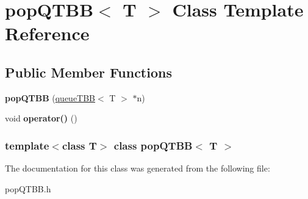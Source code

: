 \hypertarget{classpopQTBB}{
\section{popQTBB$<$ T $>$ Class Template Reference}
\label{classpopQTBB}
}
\subsection*{Public Member Functions}
\begin{DoxyCompactItemize}
\item 
\hypertarget{classpopQTBB_a4351f1dbfc315e5c99afd021fcaa80a1}{
{\bfseries popQTBB} (\hyperlink{classqueueTBB}{queueTBB}$<$ T $>$ $\ast$n)}
\label{classpopQTBB_a4351f1dbfc315e5c99afd021fcaa80a1}

\item 
\hypertarget{classpopQTBB_aeed38f3a896d68f35afcdf743469d191}{
void {\bfseries operator()} ()}
\label{classpopQTBB_aeed38f3a896d68f35afcdf743469d191}

\end{DoxyCompactItemize}
\subsubsection*{template$<$class T$>$ class popQTBB$<$ T $>$}



The documentation for this class was generated from the following file:\begin{DoxyCompactItemize}
\item 
popQTBB.h\end{DoxyCompactItemize}

